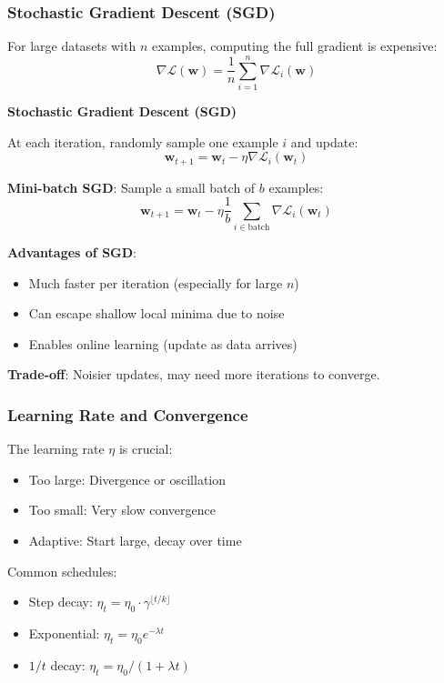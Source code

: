 \documentclass[11pt,twoside]{article}
\numberwithin{equation}{section}
\newcommand{\vect}[1]{\bm{#1}}
\newcommand{\Loss}{\mathcal{L}}
\theoremstyle{plain}
\theoremstyle{definition}
\theoremstyle{remark}
\newenvironment{keyidea}{
  \begin{tcolorbox}[colback=yellow!5!white,
                    colframe=yellow!50!black,
                    title=Key Idea,
                    breakable,
                    enhanced,
                    sharp corners,
                    boxrule=0.8pt,
                    left=6pt, right=6pt, top=6pt, bottom=6pt]
}{
  \end{tcolorbox}
}
\begin{document}
\subsubsection{Stochastic Gradient Descent (SGD)}

For large datasets with $n$ examples, computing the full gradient is expensive:
\[
\nabla \Loss(\vect{w}) = \frac{1}{n}\sum_{i=1}^n \nabla \Loss_i(\vect{w})
\]

\begin{algorithmbox}
\textbf{Stochastic Gradient Descent (SGD)}

At each iteration, randomly sample one example $i$ and update:
\[
\vect{w}_{t+1} = \vect{w}_t - \eta \nabla \Loss_i(\vect{w}_t)
\]

\textbf{Mini-batch SGD}: Sample a small batch of $b$ examples:
\[
\vect{w}_{t+1} = \vect{w}_t - \eta \frac{1}{b}\sum_{i \in \text{batch}} \nabla \Loss_i(\vect{w}_t)
\]
\end{algorithmbox}

\textbf{Advantages of SGD}:
\begin{itemize}
\item Much faster per iteration (especially for large $n$)
\item Can escape shallow local minima due to noise
\item Enables online learning (update as data arrives)
\end{itemize}

\textbf{Trade-off}: Noisier updates, may need more iterations to converge.

\subsubsection{Learning Rate and Convergence}

\begin{keyidea}
The learning rate $\eta$ is crucial:
\begin{itemize}
\item Too large: Divergence or oscillation
\item Too small: Very slow convergence
\item Adaptive: Start large, decay over time
\end{itemize}

Common schedules:
\begin{itemize}
\item Step decay: $\eta_t = \eta_0 \cdot \gamma^{\lfloor t/k \rfloor}$
\item Exponential: $\eta_t = \eta_0 e^{-\lambda t}$
\item $1/t$ decay: $\eta_t = \eta_0 / (1 + \lambda t)$
\end{itemize}
\end{keyidea}
\end{document}
